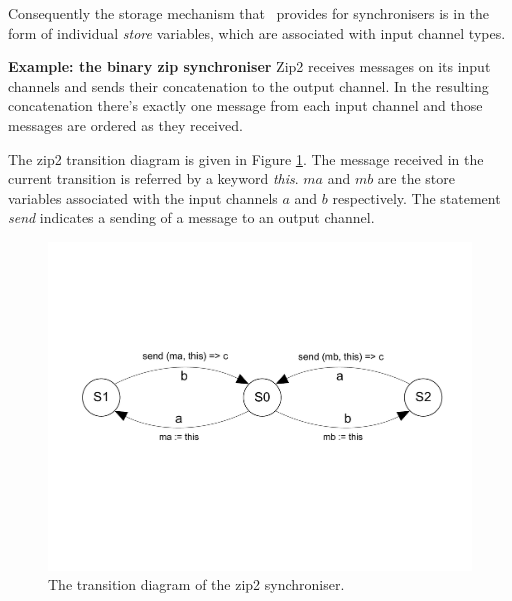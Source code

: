 \begin{enumerate}
Consequently the storage mechanism that \ak\ provides for synchronisers is in the form of individual \emph{store} variables, which are associated with input channel types.

\textbf{Example: the binary zip synchroniser}  Zip2 receives messages on its input channels and sends their concatenation to the output channel. In the resulting concatenation there's exactly one message from each input channel and those messages are ordered as they received.

The zip2 transition diagram is given in Figure \ref{fig:zip2}. The message received in the current transition is referred by a keyword \emph{this}. $ma$ and $mb$ are the store variables associated with the input channels $a$ and $b$ respectively. The statement \emph{send} indicates a sending of a message to an output channel.

  \begin{figure}[here]
  \centering
  \includegraphics[scale=0.4]{figs/zip2.pdf}
  \caption{The transition diagram of the zip2 synchroniser.}
  \label{fig:zip2}
  \end{figure}


\end{enumerate}
